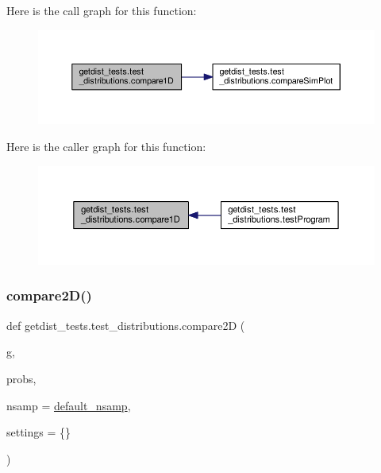Here is the call graph for this function\+:
\nopagebreak
\begin{figure}[H]
\begin{center}
\leavevmode
\includegraphics[width=350pt]{namespacegetdist__tests_1_1test__distributions_a58a3396fc92c2a94495d2f7f5a7afbb7_cgraph}
\end{center}
\end{figure}
Here is the caller graph for this function\+:
\nopagebreak
\begin{figure}[H]
\begin{center}
\leavevmode
\includegraphics[width=350pt]{namespacegetdist__tests_1_1test__distributions_a58a3396fc92c2a94495d2f7f5a7afbb7_icgraph}
\end{center}
\end{figure}
\mbox{\label{namespacegetdist__tests_1_1test__distributions_a26f4c8bf142c2c7fe7c5b0369c093bd1}} 
\subsubsection{\texorpdfstring{compare2\+D()}{compare2D()}}
{\footnotesize\ttfamily def getdist\+\_\+tests.\+test\+\_\+distributions.\+compare2D (\begin{DoxyParamCaption}\item[{}]{g,  }\item[{}]{probs,  }\item[{}]{nsamp = {\ttfamily \mbox{\hyperlink{namespacegetdist__tests_1_1test__distributions_af66b4064706bf88e0ed5378ff868fc39}{default\+\_\+nsamp}}},  }\item[{}]{settings = {\ttfamily \{\}} }\end{DoxyParamCaption})}



